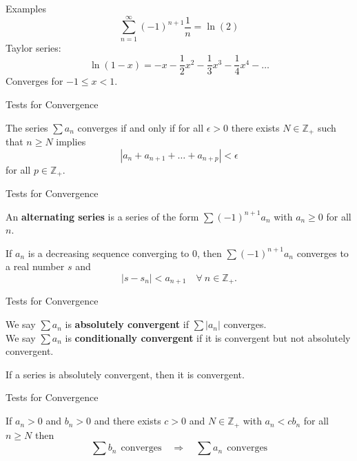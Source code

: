 \documentclass{beamer}
\begin{document}
\begin{frame}{Examples}
$$\sum_{n=1}^\infty (-1)^{n+1}\frac{1}{n} = \ln(2)$$
\pause
Taylor series:
\pause
$$\ln(1-x) = -x - \frac{1}{2}x^2 - \frac{1}{3}x^3 - \frac{1}{4}x^4 - \dots$$
\pause
Converges for $-1\leq x < 1$.
\end{frame}

\begin{frame}{Tests for Convergence}
\begin{thm}
The series $\sum a_n$ converges if and only if for all $\epsilon > 0$ there exists $N\in\mathbb Z_+$ such that $n\geq N$ implies
$$\left\lvert a_{n} + a_{n+1} + \dots + a_{n+p}\right\rvert < \epsilon$$
for all $p\in\mathbb Z_+$.
\end{thm}
\end{frame}

\begin{frame}{Tests for Convergence}
\begin{defn}
An \textbf{alternating series} is a series of the form $\sum (-1)^{n+1}a_n$ with $a_n\geq 0$ for all $n$.
\end{defn}
\begin{thm}
If $a_n$ is a decreasing sequence converging to $0$, then $\sum (-1)^{n+1}a_n$ converges to a real number $s$ and
$$|s-s_n| < a_{n+1}\quad\forall\ n\in\mathbb Z_+.$$
\end{thm}
\end{frame}

\begin{frame}{Tests for Convergence}
\begin{defn}
We say $\sum a_n$ is \textbf{absolutely convergent} if $\sum |a_n|$ converges.\\
We say $\sum a_n$ is \textbf{conditionally convergent} if it is convergent but not absolutely convergent.
\end{defn}
\begin{thm}
If a series is absolutely convergent, then it is convergent.
\end{thm}
\end{frame}

\begin{frame}{Tests for Convergence}
\begin{thm}
If $a_n>0$ and $b_n > 0$ and there exists $c>0$ and $N\in\mathbb Z_+$ with $a_n < cb_n$ for all $n\geq N$ then
$$\sum b_n\ \ \text{converges}\quad \Rightarrow\quad\sum a_n\ \ \text{converges}$$
\end{thm}
\end{frame}
\end{document}
